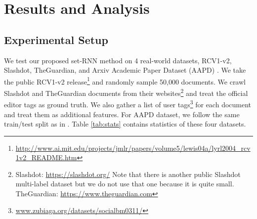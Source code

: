 \section{Results and Analysis}
\label{sec:results}
\subsection{Experimental Setup}

We test our proposed set-RNN method on 4 real-world datasets, RCV1-v2, Slashdot, TheGuardian, and Arxiv Academic Paper Dataset (AAPD) \cite{DBLP:journals/corr/abs-1806-04822}. We take the public RCV1-v2 release\footnote{\scriptsize\url{http://www.ai.mit.edu/projects/jmlr/papers/volume5/lewis04a/lyrl2004_rcv1v2_README.htm}} and randomly sample 50,000 documents. We crawl Slashdot and TheGuardian documents from their websites\footnote{\scriptsize Slashdot: \url{https://slashdot.org/} Note that there is another public Slashdot multi-label dataset \cite{read2009classifier} but we do not use that one because it is quite small. TheGuardian: \url{https://www.theguardian.com}  
} and treat the official editor tags as ground truth. We also gather a list of user tags\footnote{\scriptsize \url{www.zubiaga.org/datasets/socialbm0311/}} for each document and treat them as additional features. For AAPD dataset, we follow the same train/test split as in \cite{DBLP:journals/corr/abs-1806-04822}. Table \ref{tab:stats} contains statistics of these four datasets. 
\begin{table}[h]
\caption{\fontsize{10}{12}\selectfont  Statistics of the datasets.}\label{tab:stats}
\end{table}


